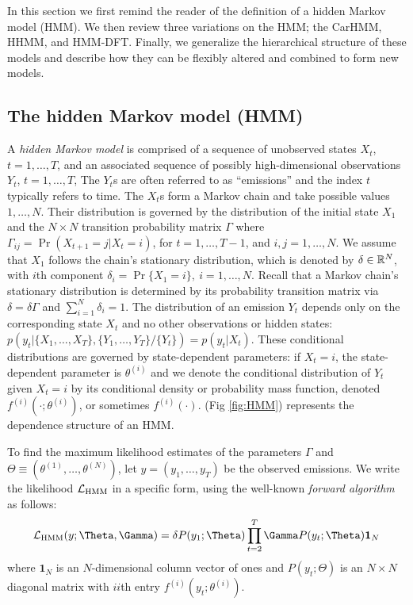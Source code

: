 %

In this section we first remind the reader of the definition of a hidden Markov model (HMM). We then review three variations on the HMM; the CarHMM, HHMM, and HMM-DFT. Finally, we generalize the hierarchical structure of these models and describe how they can be flexibly altered and combined to form new models.

\subsection{The hidden Markov model (HMM)}

A \textit{hidden Markov model}  is comprised of a sequence of  unobserved states $X_t$, $t = 1, \ldots, T$, and an associated sequence of  possibly high-dimensional observations $Y_t$, $t = 1, \ldots, T$,
The $Y_t$s are often referred to as ``emissions'' and the index $t$ typically refers to time. 
The $X_t$s form a Markov chain and take possible values $1, \ldots, N$. Their distribution is governed by the distribution of the initial state $X_1$ and the $N \times N$ transition probability matrix $\Gamma$ where $\Gamma_{ij} = \Pr(X_{t+1} = j | X_t = i)$, for $t=1,\ldots, T-1$, and $i, j = 1,\ldots, N$. 
%
We assume that $X_1$ follows the chain's stationary distribution, which is denoted by $\delta \in \mathbb{R}^N$, with $i$th component
$\delta_i = \Pr\{X_1 = i\},~ i = 1,\ldots,N.$
%
Recall that a Markov chain's stationary distribution is determined by its probability transition matrix via $\delta = \delta \Gamma$ and $\sum_{i=1}^N \delta_i = 1$.
%
The distribution of an emission $Y_t$ depends only on the corresponding state $X_t$ and no other observations or hidden states: $p\left(y_t|\{X_1,\ldots, X_T\},\{Y_1,\ldots, Y_T\}/ \{Y_t\}\right) = p(y_t|X_t)$.
%
These conditional distributions are governed by state-dependent parameters: if $X_t = i$, the state-dependent parameter is $\theta^{(i)}$ and we denote the conditional distribution of $Y_t$ given $X_t=i$ by its conditional density or probability mass function, denoted $f^{(i)}(\cdot ; \theta^{(i)})$, or sometimes  $f^{(i)}(\cdot)$.
%
(Fig \ref{fig:HMM}) represents the dependence structure of an HMM.

To find the maximum likelihood estimates of the parameters $\Gamma$ and $\Theta \equiv (\theta^{(1)},\ldots,\theta^{(N)})$, let $y = (y_1,\ldots,y_T)$ be the observed emissions. 
We write the likelihood $\mathcal{L}_{\text{HMM}}$ in a specific form, using the  well-known \textit{forward algorithm} \citep{Zucchini:2016} as follows:
%
$$\calL_{\text{HMM}}(y;\Theta,\Gamma) = \delta P(y_1;\Theta) \prod_{t=2}^T \Gamma P(y_t;\Theta) \mathbf{1}_N$$
%
where $\mathbf{1}_N$ is an $N$-dimensional column vector of ones and
%
$P(y_t;\Theta)$ is an $N \times N$ diagonal matrix with $ii$th entry  $f^{(i)}(y_t; \theta^{(i)})$.
%

